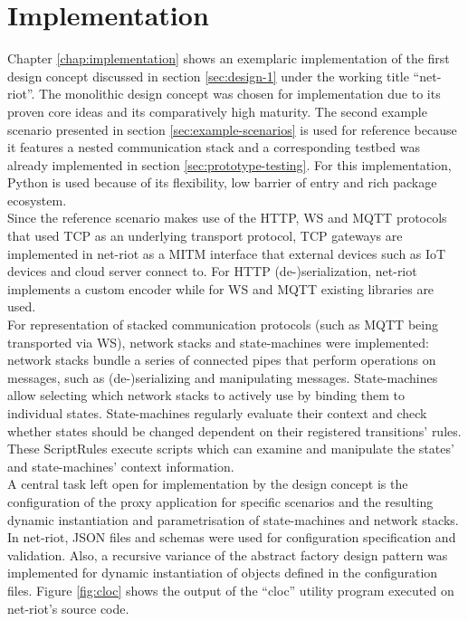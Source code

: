 \section{Implementation}
\label{sec:summary-implementation}
Chapter \ref{chap:implementation} shows an exemplaric implementation of the first design concept discussed in section \ref{sec:design-1} under the working title \enquote{net-riot}. The monolithic design concept was chosen for implementation due to its proven core ideas and its comparatively high maturity. The second example scenario presented in section \ref{sec:example-scenarios} is used for reference because it features a nested communication stack and a corresponding testbed was already implemented in section \ref{sec:prototype-testing}. For this implementation, Python is used because of its flexibility, low barrier of entry and rich package ecosystem.\\
Since the reference scenario makes use of the \ac{HTTP}, \ac{WS} and \ac{MQTT} protocols that used \ac{TCP} as an underlying transport protocol, \ac{TCP} gateways are implemented in net-riot as a \ac{MITM} interface that external devices such as \ac{IoT} devices and cloud server connect to. For \ac{HTTP} (de-)serialization, net-riot implements a custom encoder while for \ac{WS} and \ac{MQTT} existing libraries are used.\\
For representation of stacked communication protocols (such as \ac{MQTT} being transported via \ac{WS}), network stacks and state-machines were implemented: network stacks bundle a series of connected pipes that perform operations on messages, such as (de-)serializing and manipulating messages. State-machines allow selecting which network stacks to actively use by binding them to individual states. State-machines regularly evaluate their context and check whether states should be changed dependent on their registered transitions' rules. These ScriptRules execute scripts which can examine and manipulate the states' and state-machines' context information.\\
A central task left open for implementation by the design concept is the configuration of the proxy application for specific scenarios and the resulting dynamic instantiation and parametrisation of state-machines and network stacks. In net-riot, \ac{JSON} files and schemas were used for configuration specification and validation. Also, a recursive variance of the abstract factory design pattern was implemented for dynamic instantiation of objects defined in the configuration files. Figure \ref{fig:cloc} shows the output of the \enquote{cloc} utility program executed on net-riot's source code. %

